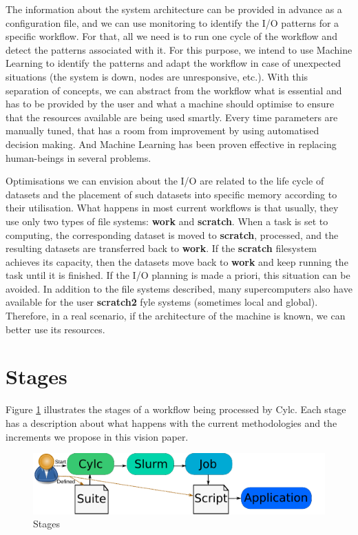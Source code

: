 \documentclass[a4paper]{article}
\begin{document}
The information about the system architecture can be provided in advance as a configuration file, and we can use monitoring to identify the I/O patterns for a specific workflow. For that, all we need is to run one cycle of the workflow and detect the patterns associated with it. For this purpose, we intend to use Machine Learning to identify the patterns and adapt the workflow in case of unexpected situations (the system is down, nodes are unresponsive, etc.).
With this separation of concepts, we can abstract from the workflow what is essential and has to be provided by the user and what a machine should optimise to ensure that the resources available are being used smartly. Every time parameters are manually tuned, that has a room from improvement by using automatised decision making. And Machine Learning has been proven effective in replacing human-beings in several problems.

Optimisations we can envision about the I/O are related to the life cycle of datasets and the placement of such datasets into specific memory according to their utilisation. What happens in most current workflows is that usually, they use only two types of file systems: \textbf{work} and \textbf{scratch}. When a task is set to computing, the corresponding dataset is moved to \textbf{scratch}, processed, and the resulting datasets are transferred back to \textbf{work}. If the \textbf{scratch} filesystem achieves its capacity, then the datasets move back to \textbf{work} and keep running the task until it is finished. If the I/O planning is made a priori, this situation can be avoided.
In addition to the file systems described, many supercomputers also have available for the user \textbf{scratch2} fyle systems (sometimes local and global). Therefore, in a real scenario, if the architecture of the machine is known, we can better use its resources.

\section{Stages}

Figure \ref{fig:stages} illustrates the stages of a workflow being processed by Cylc. Each stage has a description about what happens with the current methodologies and the increments we propose in this vision paper.

\begin{figure}[H]
  \centering
  \includegraphics[scale=1.4]{stages}
  \caption{Stages}
  \label{fig:stages}
\end{figure}
\end{document}
